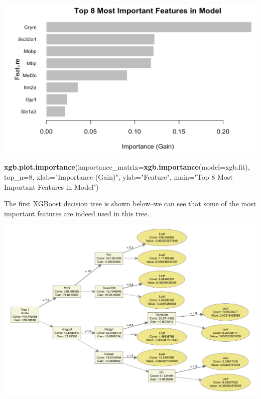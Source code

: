 \documentclass[]{article}
\newenvironment{Shaded}{\begin{snugshade}}{\end{snugshade}}
\newcommand{\DataTypeTok}[1]{\textcolor[rgb]{0.13,0.29,0.53}{#1}}
\newcommand{\DecValTok}[1]{\textcolor[rgb]{0.00,0.00,0.81}{#1}}
\newcommand{\KeywordTok}[1]{\textcolor[rgb]{0.13,0.29,0.53}{\textbf{#1}}}
\newcommand{\NormalTok}[1]{#1}
\newcommand{\StringTok}[1]{\textcolor[rgb]{0.31,0.60,0.02}{#1}}
\begin{document}
\includegraphics{Importance 1.png}

\begin{Shaded}
\begin{Highlighting}[]
\KeywordTok{xgb.plot.importance}\NormalTok{(}\DataTypeTok{importance_matrix=}\KeywordTok{xgb.importance}\NormalTok{(}\DataTypeTok{model=}\NormalTok{xgb.fit),}
                    \DataTypeTok{top_n=}\DecValTok{8}\NormalTok{,}
                    \DataTypeTok{xlab=}\StringTok{"Importance (Gain)"}\NormalTok{,}
                    \DataTypeTok{ylab=}\StringTok{"Feature"}\NormalTok{,}
                    \DataTypeTok{main=}\StringTok{"Top 8 Most Important Features in Model"}\NormalTok{)}
\end{Highlighting}
\end{Shaded}

The first XGBoost decision tree is shown below--we can see that some of
the most important features are indeed used in this tree.

\includegraphics{Tree 1.png}
\end{document}
